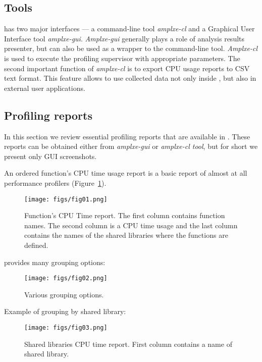 \documentclass[a4paper]{jpconf}
\begin{document}
\subsection{Tools}

\amp has two major interfaces --- a command-line tool {\it amplxe-cl} and a Graphical User Interface 
tool {\it amplxe-gui}. {\it Amplxe-gui} generally plays a role of analysis results presenter, but can also be used as 
a wrapper to the  command-line tool. {\it Amplxe-cl} is used to execute the profiling supervisor with appropriate 
parameters.  The second important function of {\it amplxe-cl} is to export CPU usage reports to CSV text format. 
This feature allows to use collected data not only inside \amp, but also in external user applications. 

\subsection{Profiling reports}

In this section we review essential profiling reports that are available in \amp. These reports can be obtained either 
from {\it amplxe-gui} or {\it amplxe-cl tool}, but for short we present only GUI screenshots.

An ordered function’s CPU time usage report is a basic report of almost at all performance profilers (Figure~\ref{fig01}).

\begin{figure}[H]
\begin{minipage}{\textwidth}
\texttt{[image: figs/fig01.png]}
\caption{\label{fig01}Function’s CPU Time report. The first column contains function names. The second column is a CPU 
time usage and the last column contains the names of the shared libraries where the functions are defined.}
\end{minipage}
\end{figure}

\amp provides many grouping options: 
\begin{figure}[H]
\begin{minipage}{\textwidth}
\texttt{[image: figs/fig02.png]}
\caption{\label{fig02}Various grouping options.}
\end{minipage}
\end{figure}

Example of grouping by shared library:

\begin{figure}[H]
\begin{minipage}{\textwidth}
\texttt{[image: figs/fig03.png]}
\caption{\label{fig03}Shared libraries  CPU time report. First column contains a name of shared library.}
\end{minipage}
\end{figure}
\end{document}
